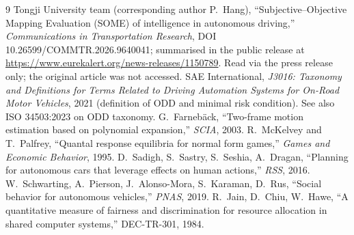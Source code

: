 \documentclass[11pt,a4paper]{article}
\begin{document}
\begin{thebibliography}{9}\small
{} Tongji University team (corresponding author P.~Hang), ``Subjective--Objective Mapping Evaluation (SOME) of intelligence in autonomous driving,'' \emph{Communications in Transportation Research}, DOI 10.26599/COMMTR.2026.9640041; summarised in the public release at \url{https://www.eurekalert.org/news-releases/1150789}. Read via the press release only; the original article was not accessed.
 SAE International, \emph{J3016: Taxonomy and Definitions for Terms Related to Driving Automation Systems for On-Road Motor Vehicles}, 2021 (definition of ODD and minimal risk condition). See also ISO 34503:2023 on ODD taxonomy.
 G.~Farneb\"ack, ``Two-frame motion estimation based on polynomial expansion,'' \emph{SCIA}, 2003.
 R.~McKelvey and T.~Palfrey, ``Quantal response equilibria for normal form games,'' \emph{Games and Economic Behavior}, 1995.
 D.~Sadigh, S.~Sastry, S.~Seshia, A.~Dragan, ``Planning for autonomous cars that leverage effects on human actions,'' \emph{RSS}, 2016.
 W.~Schwarting, A.~Pierson, J.~Alonso-Mora, S.~Karaman, D.~Rus, ``Social behavior for autonomous vehicles,'' \emph{PNAS}, 2019.
 R.~Jain, D.~Chiu, W.~Hawe, ``A quantitative measure of fairness and discrimination for resource allocation in shared computer systems,'' DEC-TR-301, 1984.
\end{thebibliography}
\end{document}
